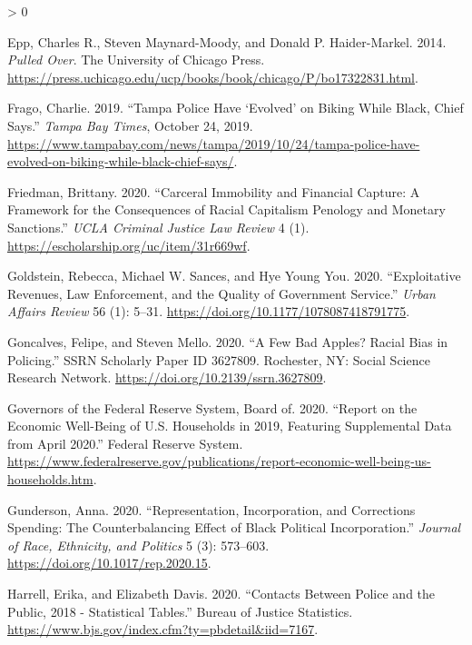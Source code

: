 \documentclass[
  12pt,
]{article}
\newlength{\cslhangindent}
\newenvironment{CSLReferences}[2] %
 {%
  \setlength{\parindent}{0pt}
  \ifodd #1 \everypar{\setlength{\hangindent}{\cslhangindent}}\ignorespaces\fi
  \ifnum #2 > 0
  \setlength{\parskip}{#2\baselineskip}
  \fi
 }%
 {}
\begin{document}
\begin{CSLReferences}{1}{0}
\leavevmode\hypertarget{ref-Epp2014}{}%
Epp, Charles R., Steven Maynard-Moody, and Donald P. Haider-Markel. 2014. \emph{Pulled {Over}}. {The University of Chicago Press}. \url{https://press.uchicago.edu/ucp/books/book/chicago/P/bo17322831.html}.

\leavevmode\hypertarget{ref-Frago2019}{}%
Frago, Charlie. 2019. {``Tampa Police Have {`Evolved'} on Biking While Black, Chief Says.''} \emph{Tampa Bay Times}, October 24, 2019. \url{https://www.tampabay.com/news/tampa/2019/10/24/tampa-police-have-evolved-on-biking-while-black-chief-says/}.

\leavevmode\hypertarget{ref-Friedman2020}{}%
Friedman, Brittany. 2020. {``Carceral {Immobility} and {Financial Capture}: {A Framework} for the {Consequences} of {Racial Capitalism Penology} and {Monetary Sanctions}.''} \emph{UCLA Criminal Justice Law Review} 4 (1). \url{https://escholarship.org/uc/item/31r669wf}.

\leavevmode\hypertarget{ref-Goldstein2020}{}%
Goldstein, Rebecca, Michael W. Sances, and Hye Young You. 2020. {``Exploitative {Revenues}, {Law Enforcement}, and the {Quality} of {Government Service}.''} \emph{Urban Affairs Review} 56 (1): 5--31. \url{https://doi.org/10.1177/1078087418791775}.

\leavevmode\hypertarget{ref-Goncalves2020}{}%
Goncalves, Felipe, and Steven Mello. 2020. {``A {Few Bad Apples}? {Racial Bias} in {Policing}.''} SSRN Scholarly Paper ID 3627809. {Rochester, NY}: {Social Science Research Network}. \url{https://doi.org/10.2139/ssrn.3627809}.

\leavevmode\hypertarget{ref-BoardofGovernorsoftheFederalReserveSystem2020}{}%
Governors of the Federal Reserve System, Board of. 2020. {``Report on the {Economic Well}-{Being} of {U}.{S}. {Households} in 2019, {Featuring Supplemental Data} from {April} 2020.''} {Federal Reserve System}. \url{https://www.federalreserve.gov/publications/report-economic-well-being-us-households.htm}.

\leavevmode\hypertarget{ref-Gunderson2020}{}%
Gunderson, Anna. 2020. {``Representation, {Incorporation}, and {Corrections Spending}: {The Counterbalancing Effect} of {Black Political Incorporation}.''} \emph{Journal of Race, Ethnicity, and Politics} 5 (3): 573--603. \url{https://doi.org/10.1017/rep.2020.15}.

\leavevmode\hypertarget{ref-Harrell2020}{}%
Harrell, Erika, and Elizabeth Davis. 2020. {``Contacts {Between Police} and the {Public}, 2018 - {Statistical Tables}.''} {Bureau of Justice Statistics}. \url{https://www.bjs.gov/index.cfm?ty=pbdetail\&iid=7167}.


\end{CSLReferences}
\end{document}

